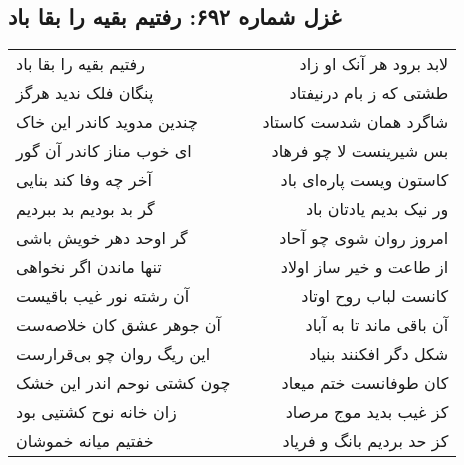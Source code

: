 \begin{center}
\section*{غزل شماره ۶۹۲: رفتیم بقیه را بقا باد}
\label{sec:0692}
\begin{longtable}{l p{0.5cm} r}
رفتیم بقیه را بقا باد
&&
لابد برود هر آنک او زاد
\\
پنگان فلک ندید هرگز
&&
طشتی که ز بام درنیفتاد
\\
چندین مدوید کاندر این خاک
&&
شاگرد همان شدست کاستاد
\\
ای خوب مناز کاندر آن گور
&&
بس شیرینست لا چو فرهاد
\\
آخر چه وفا کند بنایی
&&
کاستون ویست پاره‌ای باد
\\
گر بد بودیم بد ببردیم
&&
ور نیک بدیم یادتان باد
\\
گر اوحد دهر خویش باشی
&&
امروز روان شوی چو آحاد
\\
تنها ماندن اگر نخواهی
&&
از طاعت و خیر ساز اولاد
\\
آن رشته نور غیب باقیست
&&
کانست لباب روح اوتاد
\\
آن جوهر عشق کان خلاصه‌ست
&&
آن باقی ماند تا به آباد
\\
این ریگ روان چو بی‌قرارست
&&
شکل دگر افکنند بنیاد
\\
چون کشتی نوحم اندر این خشک
&&
کان طوفانست ختم میعاد
\\
زان خانه نوح کشتیی بود
&&
کز غیب بدید موج مرصاد
\\
خفتیم میانه خموشان
&&
کز حد بردیم بانگ و فریاد
\\
\end{longtable}
\end{center}
